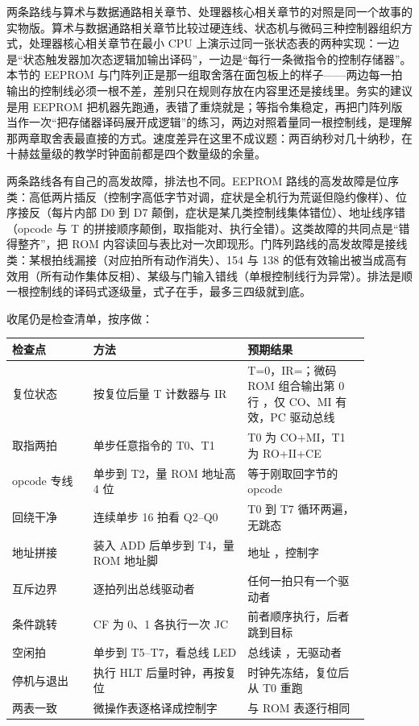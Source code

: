 两条路线与算术与数据通路相关章节、处理器核心相关章节的对照是同一个故事的实物版。算术与数据通路相关章节比较过硬连线、状态机与微码三种控制器组织方式，处理器核心相关章节在最小 CPU 上演示过同一张状态表的两种实现：一边是“状态触发器加次态逻辑加输出译码”，一边是“每行一条微指令的控制存储器”。本节的 EEPROM 与门阵列正是那一组取舍落在面包板上的样子——两边每一拍输出的控制线必须一根不差，差别只在规则存放在内容里还是接线里。务实的建议是用 EEPROM 把机器先跑通，表错了重烧就是；等指令集稳定，再把门阵列版当作一次“把存储器译码展开成逻辑”的练习，两边对照着量同一根控制线，是理解那两章取舍表最直接的方式。速度差异在这里不成议题：两百纳秒对几十纳秒，在十赫兹量级的教学时钟面前都是四个数量级的余量。

两条路线各有自己的高发故障，排法也不同。EEPROM 路线的高发故障是位序类：高低两片插反（控制字高低字节对调，症状是全机行为荒诞但隐约像样）、位序接反（每片内部 D0 到 D7 颠倒，症状是某几类控制线集体错位）、地址线序错（opcode 与 T 的拼接顺序颠倒，取指能对、执行全错）。这类故障的共同点是“错得整齐”，把 ROM 内容读回与表比对一次即现形。门阵列路线的高发故障是接线类：某根拍线漏接（对应拍所有动作消失）、154 与 138 的低有效输出被当成高有效用（所有动作集体反相）、某级与门输入错线（单根控制线行为异常）。排法是顺一根控制线的译码式逐级量，式子在手，最多三四级就到底。

收尾仍是检查清单，按序做：

\begin{longtable}{L{0.20\linewidth}L{0.38\linewidth}L{0.30\linewidth}}
\toprule
检查点 & 方法 & 预期结果 \\
\midrule
复位状态 & 按复位后量 T 计数器与 IR & T=0，IR=；微码 ROM 组合输出第 0 行 ，仅 CO、MI 有效，PC 驱动总线 \\\tablerowrule
取指两拍 & 单步任意指令的 T0、T1 & T0 为 CO+MI，T1 为 RO+II+CE \\\tablerowrule
opcode 专线 & 单步到 T2，量 ROM 地址高 4 位 & 等于刚取回字节的 opcode \\\tablerowrule
回绕干净 & 连续单步 16 拍看 Q2–Q0 & T0 到 T7 循环两遍，无跳态 \\\tablerowrule
地址拼接 & 装入 ADD 后单步到 T4，量 ROM 地址脚 & 地址 ，控制字  \\\tablerowrule
互斥边界 & 逐拍列出总线驱动者 & 任何一拍只有一个驱动者 \\\tablerowrule
条件跳转 & CF 为 0、1 各执行一次 JC & 前者顺序执行，后者跳到目标 \\\tablerowrule
空闲拍 & 单步到 T5–T7，看总线 LED & 总线读 ，无驱动者 \\\tablerowrule
停机与退出 & 执行 HLT 后量时钟，再按复位 & 时钟先冻结，复位后从 T0 重跑 \\\tablerowrule
两表一致 & 微操作表逐格译成控制字 & 与 ROM 表逐行相同 \\
\bottomrule
\end{longtable}

